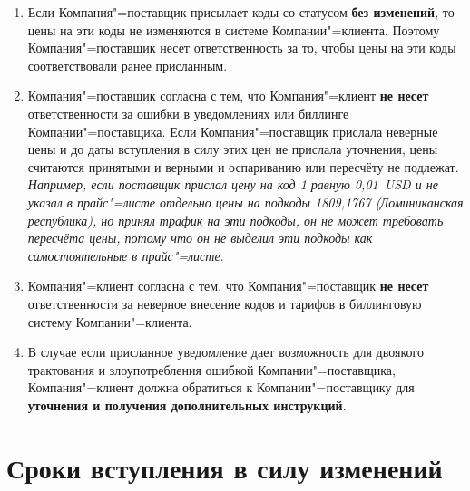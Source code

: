 \begin{Form}
\begin{enumerate}[label=\thesection.\arabic*.]
  \item Если Компания"=поставщик присылает коды со статусом \textbf{\flqq{}без
      изменений\frqq{}}, то цены на эти коды не изменяются в системе Компании"=клиента.
    Поэтому Компания"=поставщик несет ответственность за то, чтобы цены
    на эти коды соответствовали ранее присланным.
  \item Компания"=поставщик согласна с тем, что Компания"=клиент \textbf{не несет} ответственности
    за ошибки в уведомлениях или биллинге Компании"=поставщика. Если Компания"=поставщик
    прислала неверные цены и до даты вступления в силу этих цен не прислала
    уточнения, цены считаются принятыми и верными и оспариванию или
    пересчёту не подлежат. \textit{Например, если поставщик прислал цену на код
    1 равную 0,01~USD и не указал в прайс"=листе отдельно цены
    на подкоды 1809,1767 (Доминиканская республика), но принял трафик
    на эти подкоды, он не может требовать пересчёта цены, потому что он
    не выделил эти подкоды как самостоятельные в прайс"=листе}.
  \item Компания"=клиент согласна с тем, что Компания"=поставщик \textbf{не несет} ответственности
    за неверное внесение кодов и тарифов в биллинговую систему Компании"=клиента.
  \item В случае если присланное уведомление дает возможность для двоякого
    трактования и злоупотребления ошибкой Компании"=поставщика, Компания"=клиент
    должна обратиться к Компании"=поставщику для \textbf{уточнения и получения
    дополнительных инструкций}.
  \end{enumerate}
  

\section{Сроки вступления в силу изменений}


\end{Form}
